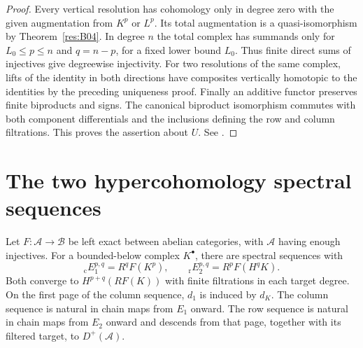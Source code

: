 \begin{proof}
Every vertical resolution has cohomology only in degree zero
with the given augmentation from \(K^p\) or \(L^p\). Its total
augmentation is a quasi-isomorphism by Theorem~\ref{res:B04}.
In degree \(n\) the total complex has summands only for
\(L_0\le p\le n\) and \(q=n-p\), for a fixed lower bound \(L_0\).
Thus finite direct sums of injectives give degreewise injectivity.
For two resolutions of the same complex, lifts of the identity
in both directions have composites vertically homotopic to the
identities by the preceding uniqueness proof. Finally an additive
functor preserves finite biproducts and signs. The canonical
biproduct isomorphism commutes with both component differentials
and the inclusions defining the row and column filtrations. This
proves the assertion about \(U\). See \cite[Tags 015J and 015K]{stacks-derived}.
\end{proof}

\section{The two hypercohomology spectral sequences}

\begin{theorem}
\label{res:G03}
Let \(F:\mathcal A\to\mathcal B\) be left exact between abelian
categories, with \(\mathcal A\) having enough injectives. For a bounded-below
complex \(K^\bullet\), there are spectral sequences with
\[
 {}_{\mathrm c}E_1^{p,q}=R^qF(K^p),
       \qquad
 {}_{\mathrm r}E_2^{p,q}=R^pF(H^qK).
\]
Both converge to \(H^{p+q}(RF(K))\) with finite filtrations in
each target degree. On the first page of the column sequence,
\(d_1\) is induced by \(d_K\). The column sequence is natural in
chain maps from \(E_1\) onward. The row sequence is natural in
chain maps from \(E_2\) onward and descends from that page,
together with its filtered target, to \(D^+(\mathcal A)\).
\end{theorem}

